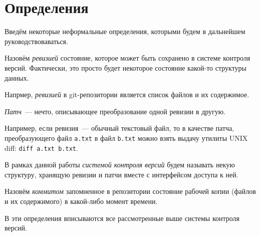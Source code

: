 

\section{Определения}

Введём некоторые неформальные определения, которыми будем в дальнейшем
руководствоваваться. 

\begin{definition}[Ревизия]
  Назовём \emph{ревизией} состояние, которое может быть сохранено в
  системе контроля версий. Фактически, это просто будет некоторое
  состояние какой-то структуры данных.
\end{definition}

Напрмер, \emph{ревизией} в git-репозитории является список файлов и их
содержимое. 

\begin{definition}[Патч]
  \emph{Патч}~--- нечто, описывающее преобразование одной ревизии в
  другую.
\end{definition}

Например, если ревизия~--- обычный текстовый файл, то в качестве
патча, преобразующего файл \texttt{a.txt} в файл \texttt{b.txt} можно
взять выдачу утилиты UNIX diff: \texttt{diff a.txt b.txt}. 

\begin{definition}
  В рамках данной работы \emph{системой контроля версий} будем
  называть некую структуру, хранящую ревизии и патчи вместе с
  интерфейсом доступа к ней.
\end{definition}

\begin{definition}[Коммит]
  Назовём \emph{коммитом} запомненное в репозитории состояние рабочей
  копии (файлов и их содержимого) в какой-либо момент времени.
\end{definition}

В эти определения вписываются все рассмотренные выше системы контроля
версий. 

